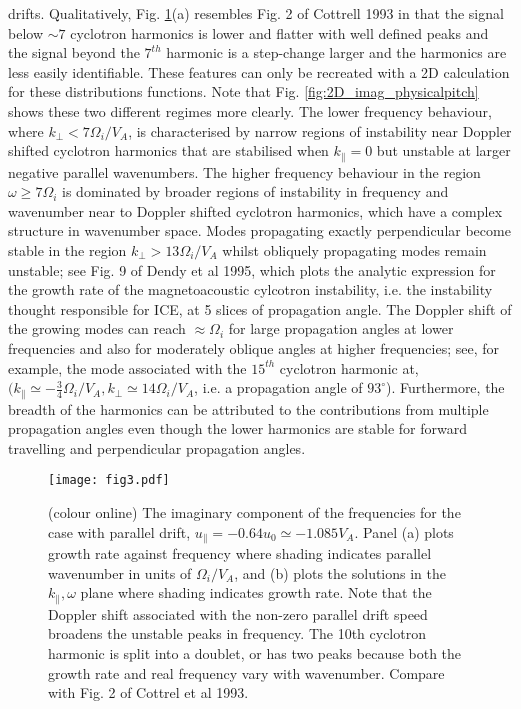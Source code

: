 \documentclass[12pt]{iopart}
\begin{document}
drifts\cite{Cottrell1993,Fulop1998}. Qualitatively, Fig. \ref{fig:2D_F12_physicalpitch}(a) resembles Fig. 2 of Cottrell 1993 in that the signal below $\sim 7$ cyclotron harmonics is lower and flatter with well defined peaks and the signal beyond the $7^{th}$ harmonic is a step-change larger and the harmonics are less easily identifiable. These features can only be recreated with a 2D calculation for these distributions functions. Note that Fig. \ref{fig:2D_imag_physicalpitch} shows these two different regimes more clearly. The lower frequency behaviour, where $k_\perp < 7 \Omega_i/V_A$, is characterised by narrow regions of instability near Doppler shifted cyclotron harmonics that are stabilised when $k_\parallel=0$ but unstable at larger negative parallel wavenumbers. The higher frequency behaviour in the region $\omega\geq 7\Omega_i$ is dominated by broader regions of instability in frequency and wavenumber near to Doppler shifted cyclotron harmonics, which have a complex structure in wavenumber space. Modes propagating exactly perpendicular become stable in the region $k_\perp > 13 \Omega_i/V_A$ whilst obliquely propagating modes remain unstable; see Fig. 9 of Dendy et al 1995, which plots the analytic expression for the growth rate of the magnetoacoustic cylcotron instability, i.e. the instability thought responsible for ICE, at 5 slices of propagation angle. The Doppler shift of the growing modes can reach $\approx \Omega_i$ for large propagation angles at lower frequencies and also for moderately oblique angles at higher frequencies; see, for example, the mode associated with the $15^{th}$ cyclotron harmonic at, $(k_\parallel \simeq -\frac{3}{4} \Omega_i/V_A, k_\perp \simeq 14 \Omega_i/V_A$, i.e. a propagation angle of $93^\circ$). Furthermore, the breadth of the harmonics can be attributed to the contributions from multiple propagation angles even though the lower harmonics are stable for forward travelling and perpendicular propagation angles.

\begin{figure}[ht!]
    \raggedleft
\texttt{[image: fig3.pdf]}
    \caption{(colour online) The imaginary component of the frequencies for the case with parallel drift, $u_{\parallel} = -0.64 u_0 \simeq -1.085 V_A$. Panel (a) plots growth rate against frequency where shading indicates parallel wavenumber in units of $\Omega_i/V_A$, and (b) plots the solutions in the $k_\parallel, \omega$ plane where shading indicates growth rate. Note that the Doppler shift associated with the non-zero parallel drift speed broadens the unstable peaks in frequency. The 10th cyclotron harmonic is split into a doublet, or has two peaks because both the growth rate and real frequency vary with wavenumber. Compare with Fig. 2 of Cottrel et al 1993.}
    \label{fig:2D_F12_physicalpitch}
\end{figure}
\end{document}
